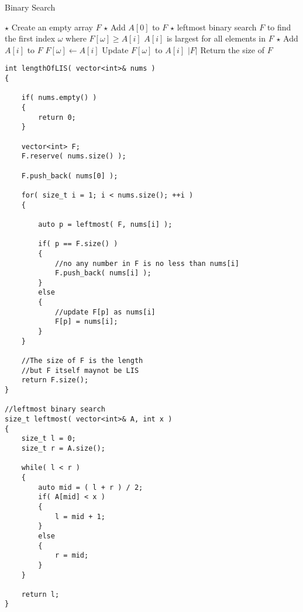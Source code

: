 \begin{algorithm}[H]
\caption{Binary Search}
\begin{algorithmic}[1]
\State $\star$ Create an empty array $F$
\State $\star$ Add $A[0]$ to $F$
\State $\star$ leftmost binary search $F$ to find the first index $\omega$ where $F[\omega]\geq A[i]$
 \Comment $A[i]$ is largest for all elements in $F$
\State  $\star$ Add $A[i]$ to $F$
\Else
\State $F[\omega]\gets A[i]$ \Comment Update $F[\omega]$ to $A[i]$
\EndIf
\EndFor
\State \Return $ \lvert F\vert $ \Comment Return the size of $F$
\EndProcedure
\end{algorithmic}
\end{algorithm}

\begin{lstlisting}[style=customc, caption={Binary Search}]
int lengthOfLIS( vector<int>& nums )
{

    if( nums.empty() )
    {
        return 0;
    }

    vector<int> F;
    F.reserve( nums.size() );

    F.push_back( nums[0] );

    for( size_t i = 1; i < nums.size(); ++i )
    {

        auto p = leftmost( F, nums[i] );

        if( p == F.size() )
        {
            //no any number in F is no less than nums[i]
            F.push_back( nums[i] );
        }
        else
        {
            //update F[p] as nums[i]
            F[p] = nums[i];
        }
    }

    //The size of F is the length
    //but F itself maynot be LIS
    return F.size();
}

//leftmost binary search
size_t leftmost( vector<int>& A, int x )
{
    size_t l = 0;
    size_t r = A.size();

    while( l < r )
    {
        auto mid = ( l + r ) / 2;
        if( A[mid] < x )
        {
            l = mid + 1;
        }
        else
        {
            r = mid;
        }
    }

    return l;
}
\end{lstlisting}